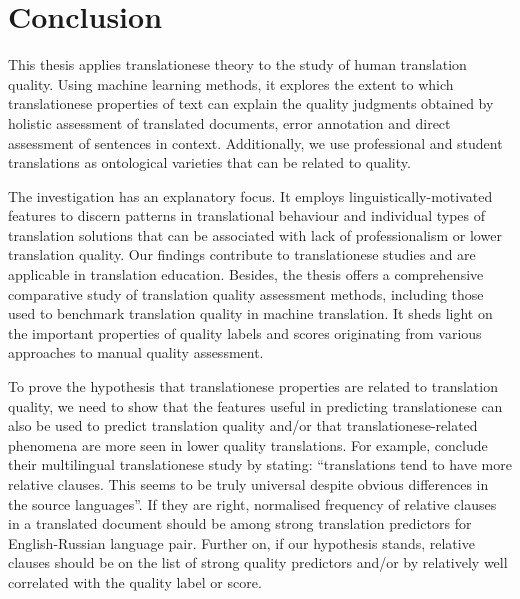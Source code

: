\chapter{\label{cha:fin}Conclusion}
This thesis applies translationese theory to the study of human translation quality. 
Using machine learning methods, it explores the extent to which translationese properties of text can explain the quality judgments obtained by holistic assessment of translated documents, error annotation and direct assessment of sentences in context. Additionally, we use professional and student translations as ontological varieties that can be related to quality. 

The investigation has an explanatory focus. It employs linguistically-motivated features to discern patterns in translational behaviour and individual types of translation solutions that can be associated with lack of professionalism or lower translation quality. Our findings contribute to translationese studies and are applicable in translation education. 
Besides, the thesis offers a comprehensive comparative study of translation quality assessment methods, including those used to benchmark translation quality in machine translation. It sheds light on the important properties of quality labels and scores originating from various approaches to manual quality assessment. 

To prove the hypothesis that translationese properties are related to translation quality, we need to show that the features useful in predicting translationese can also be used to predict translation quality and/or that translationese-related phenomena are more seen in lower quality translations. For example, \citet[][p.357]{Hu2021} conclude their multilingual translationese study by stating: ``translations tend to have more relative clauses. This seems to be truly universal despite obvious differences in the source languages''. If they are right, normalised frequency of relative clauses in a translated document should be among strong translation predictors for English-Russian language pair. Further on, if our hypothesis stands, relative clauses should be on the list of strong quality predictors and/or by relatively well correlated with the quality label or score. 

